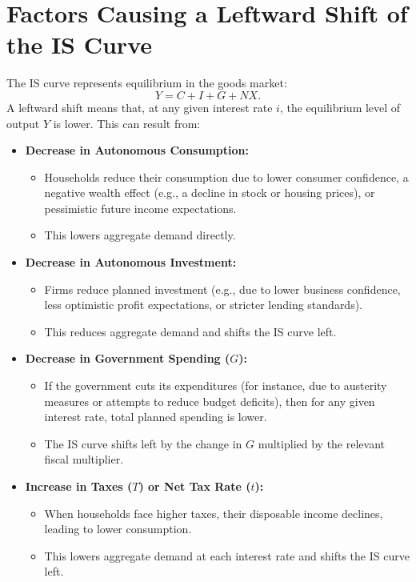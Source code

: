 \section*{Factors Causing a Leftward Shift of the IS Curve}
\noindent
The IS curve represents equilibrium in the goods market: 
\[
Y = C + I + G + NX.
\]
A leftward shift means that, at any given interest rate $i$, the equilibrium level of output $Y$ is lower. This can result from:
\begin{itemize}
    \item \textbf{Decrease in Autonomous Consumption:}
    \begin{itemize}
        \item Households reduce their consumption due to lower consumer confidence, a negative wealth effect (e.g., a decline in stock or housing prices), or pessimistic future income expectations.
        \item This lowers aggregate demand directly.
    \end{itemize}
    \item \textbf{Decrease in Autonomous Investment:}
    \begin{itemize}
        \item Firms reduce planned investment (e.g., due to lower business confidence, less optimistic profit expectations, or stricter lending standards).
        \item This reduces aggregate demand and shifts the IS curve left.
    \end{itemize}
    \item \textbf{Decrease in Government Spending ($G$):}
    \begin{itemize}
        \item If the government cuts its expenditures (for instance, due to austerity measures or attempts to reduce budget deficits), then for any given interest rate, total planned spending is lower.
        \item The IS curve shifts left by the change in $G$ multiplied by the relevant fiscal multiplier.
    \end{itemize}
    \item \textbf{Increase in Taxes ($T$) or Net Tax Rate ($t$):}
    \begin{itemize}
        \item When households face higher taxes, their disposable income declines, leading to lower consumption.
        \item This lowers aggregate demand at each interest rate and shifts the IS curve left.

\end{itemize}
\end{itemize}
